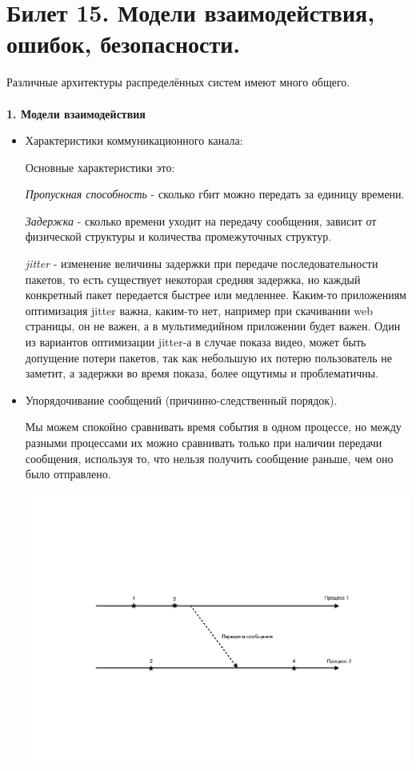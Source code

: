 \newpage
\section {Билет 15. Модели взаимодействия, ошибок, безопасности.}

Различные архитектуры распределённых систем имеют много общего.\\
\\
\textbf{1. Модели взаимодействия}
\begin{itemize}
\item Характеристики коммуникационного канала:

Основные характеристики это:

\hspace{-6px}\textit{Пропускная способность} - сколько гбит можно передать за единицу времени.

\hspace{-6px}\textit{Задержка} - сколько времени уходит на передачу сообщения, зависит от физической структуры и количества промежуточных структур.

\hspace{-6px}\textit{jitter} - изменение величины задержки при передаче последовательности пакетов, то есть существует некоторая средняя задержка, но каждый конкретный пакет передается быстрее или медленнее. Каким-то приложениям оптимизация jitter важна, каким-то нет, например при скачивании web страницы, он не важен, а в мультимедийном приложении будет важен. Один из вариантов оптимизации jitter-а в случае показа видео, может быть допущение потери пакетов, так как небольшую их потерю пользователь не заметит, а задержки во время показа, более ощутимы и проблематичны.

\item Упорядочивание сообщений (причинно-следственный порядок).

Мы можем спокойно сравнивать время события в одном процессе, но между разными процессами их можно сравнивать только при наличии передачи сообщения, используя то, что нельзя получить сообщение раньше, чем оно было отправлено.

\includegraphics[scale=0.7]{15/masseg_time.pdf}


\end{itemize}
